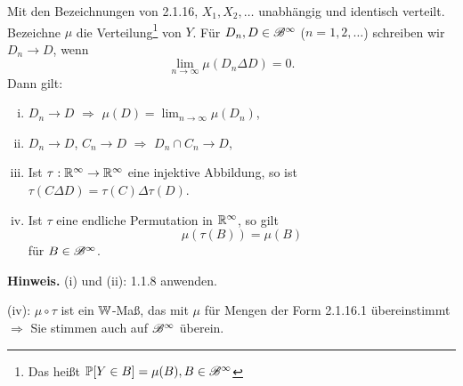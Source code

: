 \begin{prgp}[Aufgabe]
  Mit den Bezeichnungen von 2.1.16, $X_1, X_2, \ldots$ unabhängig und identisch
  verteilt. Bezeichne $\mu$ die Verteilung\footnote{%
    Das heißt $\mathbb{P}[Y \in B] = \mu(B), B \in \mathscr{B}^\infty$}
  von $Y$. Für $D_n, D \in \mathscr{B}^\infty$ ($n=1,2,\ldots$) schreiben wir $D_n
  \to D$, wenn
  \[ \lim_{n \to \infty} \mu( D_n \Delta D) = 0.\]
  Dann gilt:
  \begin{enumerate}[(i)]
  \item $D_n \to D$ $\Rightarrow$ $\mu(D) = \lim_{n \to \infty}\mu(D_n)$,
  \item $D_n \to D$, $C_n \to D$ $\Rightarrow$ $D_n \cap C_n \to D$,
  \item Ist $\tau: \mathbb{R}^\infty \to \mathbb{R}^\infty$ eine injektive Abbildung, so
    ist $\tau(C \Delta D) = \tau(C) \Delta \tau(D)$.
  \item Ist $\tau$ eine endliche Permutation in $\mathbb{R}^\infty$, so gilt
    \[ \mu( \tau(B) ) = \mu(B) \]
    für $B \in \mathscr{B}^\infty$.
  \end{enumerate}
  \textbf{Hinweis.} (i) und (ii): 1.1.8 anwenden.

  (iv): $\mu \circ \tau$ ist ein $\mathbb{W}$-Maß, das mit $\mu$ für Mengen der Form
  2.1.16.1 übereinstimmt $\Rightarrow$ Sie stimmen auch auf $\mathscr{B}^\infty$
  überein.
\end{prgp}

